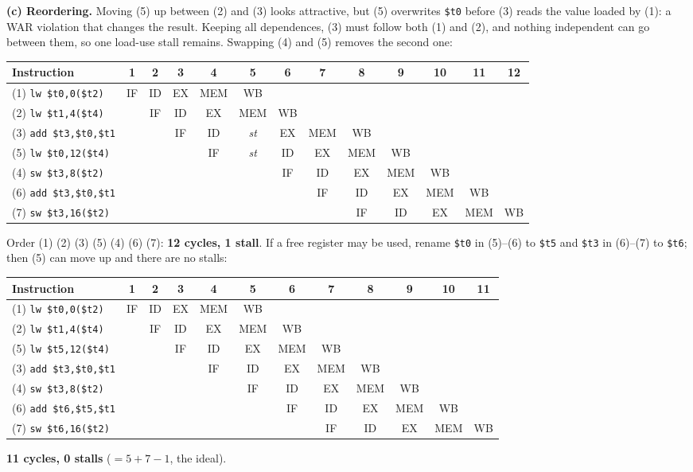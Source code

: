 \begin{solution}
\textbf{(c) Reordering.} Moving (5) up between (2) and (3) looks attractive, but
(5) overwrites \texttt{\$t0} before (3) reads the value loaded by (1): a WAR
violation that changes the result. Keeping all dependences, (3) must follow both
(1) and (2), and nothing independent can go between them, so one load-use stall
remains. Swapping (4) and (5) removes the second one:
\begin{center}\scriptsize\setlength{\tabcolsep}{1.6pt}
\begin{tabular}{@{}lcccccccccccc@{}}
\toprule
Instruction & 1 & 2 & 3 & 4 & 5 & 6 & 7 & 8 & 9 & 10 & 11 & 12 \\
\midrule
(1) \texttt{lw \$t0,0(\$t2)} & IF & ID & EX & MEM & WB &  &  &  &  &  &  &  \\
(2) \texttt{lw \$t1,4(\$t4)} &  & IF & ID & EX & MEM & WB &  &  &  &  &  &  \\
(3) \texttt{add \$t3,\$t0,\$t1} &  &  & IF & ID & \textit{st} & EX & MEM & WB &  &  &  &  \\
(5) \texttt{lw \$t0,12(\$t4)} &  &  &  & IF & \textit{st} & ID & EX & MEM & WB &  &  &  \\
(4) \texttt{sw \$t3,8(\$t2)} &  &  &  &  &  & IF & ID & EX & MEM & WB &  &  \\
(6) \texttt{add \$t3,\$t0,\$t1} &  &  &  &  &  &  & IF & ID & EX & MEM & WB &  \\
(7) \texttt{sw \$t3,16(\$t2)} &  &  &  &  &  &  &  & IF & ID & EX & MEM & WB \\
\bottomrule
\end{tabular}
\end{center}
Order (1) (2) (3) (5) (4) (6) (7): \textbf{12 cycles, 1 stall}. If a free register
may be used, rename \texttt{\$t0} in (5)--(6) to \texttt{\$t5} and \texttt{\$t3} in
(6)--(7) to \texttt{\$t6}; then (5) can move up and there are no stalls:
\begin{center}\scriptsize\setlength{\tabcolsep}{1.6pt}
\begin{tabular}{@{}lccccccccccc@{}}
\toprule
Instruction & 1 & 2 & 3 & 4 & 5 & 6 & 7 & 8 & 9 & 10 & 11 \\
\midrule
(1) \texttt{lw \$t0,0(\$t2)} & IF & ID & EX & MEM & WB &  &  &  &  &  &  \\
(2) \texttt{lw \$t1,4(\$t4)} &  & IF & ID & EX & MEM & WB &  &  &  &  &  \\
(5) \texttt{lw \$t5,12(\$t4)} &  &  & IF & ID & EX & MEM & WB &  &  &  &  \\
(3) \texttt{add \$t3,\$t0,\$t1} &  &  &  & IF & ID & EX & MEM & WB &  &  &  \\
(4) \texttt{sw \$t3,8(\$t2)} &  &  &  &  & IF & ID & EX & MEM & WB &  &  \\
(6) \texttt{add \$t6,\$t5,\$t1} &  &  &  &  &  & IF & ID & EX & MEM & WB &  \\
(7) \texttt{sw \$t6,16(\$t2)} &  &  &  &  &  &  & IF & ID & EX & MEM & WB \\
\bottomrule
\end{tabular}
\end{center}
\textbf{11 cycles, 0 stalls} ($=5+7-1$, the ideal).
\end{solution}

